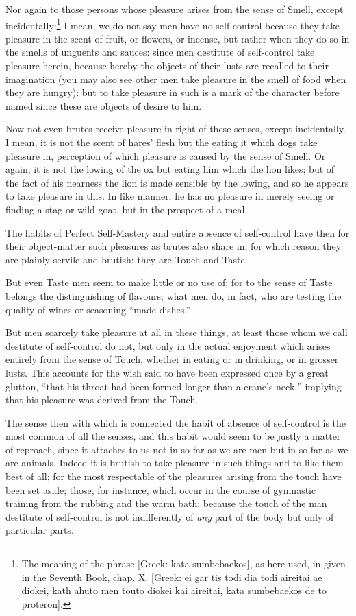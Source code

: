 Nor again to those persons whose pleasure arises from the sense of Smell,
except incidentally:\footnote{The meaning of the phrase [Greek: kata sumbebaekos], as here used, in given in
the Seventh Book, chap. X. [Greek: ei gar tis todi dia todi aireitai ae diokei,
kath ahuto men touto diokei kai aireitai, kata sumbebaekos de to proteron].}
I mean, we do not say men have no self-control because they take pleasure in
the scent of fruit, or flowers, or incense, but rather when they do so in the
smells of unguents and sauces: since men destitute of self-control take
pleasure herein, because hereby the objects of their lusts are recalled to
their imagination (you may also see other men take pleasure in the smell of
food when they are hungry): but to take pleasure in such is a mark of the
character before named since these are objects of desire to him.

Now not even brutes receive pleasure in right of these senses, except
incidentally. I mean, it is not the scent of hares’ flesh but the eating
it which dogs take pleasure in, perception of which pleasure is caused by the
sense of Smell. Or again, it is not the lowing of the ox but eating him which
the lion likes; but of the fact of his nearness the lion is made sensible by
the lowing, and so he appears to take pleasure in this. In like manner, he has
no pleasure in merely seeing or finding a stag or wild goat, but in the
prospect of a meal.

The habits of Perfect Self-Mastery and entire absence of self-control have then
for their object-matter such pleasures as brutes also share in, for which
reason they are plainly servile and brutish: they are Touch and Taste.

But even Taste men seem to make little or no use of; for to the sense of Taste
belongs the distinguishing of flavours; what men do, in fact, who are testing
the quality of wines or seasoning “made dishes.”

But men scarcely take pleasure at all in these things, at least those whom we
call destitute of self-control do not, but only in the actual enjoyment which
arises entirely from the sense of Touch, whether in eating or in drinking, or
in grosser lusts. This accounts for the wish said to have been expressed once
by a great glutton, “that his throat had been formed longer than a
crane’s neck,” implying that his pleasure was derived from the
Touch.

The sense then with which is connected the habit of absence of self-control is
the most common of all the senses, and this habit would seem to be justly a
matter of reproach, since it attaches to us not in so far as we are men but in
so far as we are animals. Indeed it is brutish to take pleasure in such things
and to like them best of all; for the most respectable of the pleasures arising
from the touch have been set aside; those, for instance, which occur in the
course of gymnastic training from the rubbing and the warm bath: because the
touch of the man destitute of self-control is not indifferently of \emph{any}
part of the body but only of particular parts.

